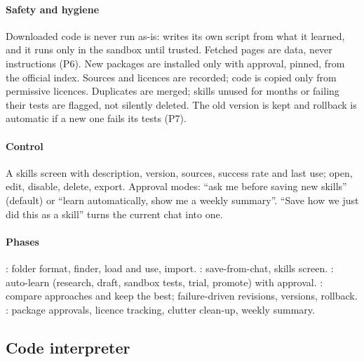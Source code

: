\paragraph{Safety and hygiene} Downloaded code is never run as-is: \hivi{} writes its own script from what it learned, and it runs only in the sandbox until trusted. Fetched pages are data, never instructions (P6). New packages are installed only with approval, pinned, from the official index. Sources and licences are recorded; code is copied only from permissive licences. Duplicates are merged; skills unused for months or failing their tests are flagged, not silently deleted. The old version is kept and rollback is automatic if a new one fails its tests (P7).

\paragraph{Control} A skills screen with description, version, sources, success rate and last use; open, edit, disable, delete, export. Approval modes: ``ask me before saving new skills'' (default) or ``learn automatically, show me a weekly summary''. ``Save how we just did this as a skill'' turns the current chat into one.

\paragraph{Phases} : folder format, finder, load and use, import. : save-from-chat, skills screen. : auto-learn (research, draft, sandbox tests, trial, promote) with approval. : compare approaches and keep the best; failure-driven revisions, versions, rollback. : package approvals, licence tracking, clutter clean-up, weekly summary.

\subsection{Code interpreter}

